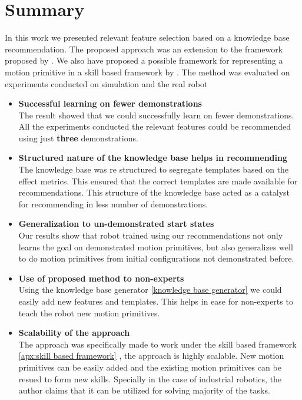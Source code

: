 \section{Summary} 
In this work we presented relevant feature selection based on
a knowledge base recommendation. The proposed approach was an 
extension to the framework proposed by \cite{abdo_inferring_2014}.
We also have proposed a possible framework for representing a motion primitive 
in a skill based framework by \cite{pedersen_robot_2015} . 
The method was evaluated on experiments conducted on simulation and 
the real robot

\begin{itemize}
    \item \textbf{Successful learning on fewer demonstrations} \\
       The result showed that we could successfully learn on fewer
       demonstrations. All the experiments conducted the relevant
       features could be recommended using just \textbf{three} demonstrations.

    \item \textbf{Structured nature of the knowledge base helps in recommending} \\
        The knowledge base was re structured to segregate templates based on the 
        effect metrics. This ensured that the correct templates are made available 
        for recommendations. This structure of the knowledge base acted as a  catalyst 
        for recommending in less number of demonstrations.

    \item \textbf{Generalization to un-demonstrated start states}\\ Our results
        show that robot trained using our recommendations not only learns the
        goal on demonstrated motion primitives, but also generalizes well to do
        motion primitives from initial configurations not demonstrated before.

    \item \textbf{Use of proposed method to non-experts}\\
        Using the knowledge base generator \ref{knowledge base generator}
        we could easily add new features and templates. This helps
        in ease for non-experts to teach the robot new motion primitives.

    \item \textbf{Scalability of the approach}\\
        The approach was specifically made to work under the skill based framework
        \ref{apx:skill based framework} , the approach is highly scalable.
        New motion primitives can be easily added and the existing motion
        primitives can be resued to form new skills. Specially in the 
        case of industrial robotics, the author claims that it can be 
        utilized for solving majority of the tasks.

\end{itemize}



